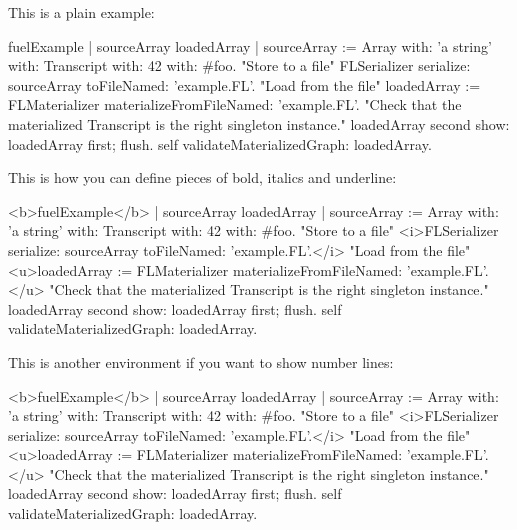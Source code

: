\documentclass{article}
\begin{document}
This is a plain example:

\begin{code}
fuelExample
	| sourceArray loadedArray |
	sourceArray := Array 
		with: 'a string' 
		with: Transcript
		with: 42
		with: #foo.
	"Store to a file"
	FLSerializer serialize: sourceArray toFileNamed: 'example.FL'.
	"Load from the file"
	loadedArray := FLMaterializer materializeFromFileNamed: 'example.FL'.
	"Check that the materialized Transcript is the right singleton instance."
	loadedArray second show: loadedArray first; flush.
	self validateMaterializedGraph: loadedArray.
\end{code}

This is how you can define pieces of bold, italics and underline:

\begin{code}
<b>fuelExample</b>
	| sourceArray loadedArray |
	sourceArray := Array
		with: 'a string' 
		with: Transcript
		with: 42
		with: #foo.
	"Store to a file"
	<i>FLSerializer serialize: sourceArray toFileNamed: 'example.FL'.</i>
	"Load from the file"
	<u>loadedArray := FLMaterializer materializeFromFileNamed: 'example.FL'.</u>
	"Check that the materialized Transcript is the right singleton instance."
	loadedArray second show: loadedArray first; flush.
	self validateMaterializedGraph: loadedArray.
\end{code}

This is another environment if you want to show number lines:

\begin{codeWithLineNumbers}
<b>fuelExample</b>
	| sourceArray loadedArray |
	sourceArray := Array
		with: 'a string' 
		with: Transcript
		with: 42
		with: #foo.
	"Store to a file"
	<i>FLSerializer serialize: sourceArray toFileNamed: 'example.FL'.</i>
	"Load from the file"
	<u>loadedArray := FLMaterializer materializeFromFileNamed: 'example.FL'.</u>
	"Check that the materialized Transcript is the right singleton instance."
	loadedArray second show: loadedArray first; flush.
	self validateMaterializedGraph: loadedArray.
\end{codeWithLineNumbers}
\end{document}
